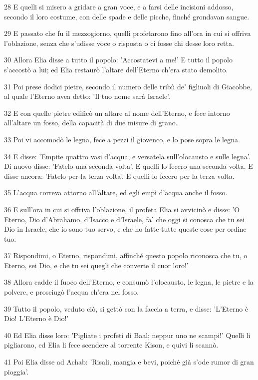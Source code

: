 \par 28 E quelli si misero a gridare a gran voce, e a farsi delle incisioni addosso, secondo il loro costume, con delle spade e delle picche, finché grondavan sangue.
\par 29 E passato che fu il mezzogiorno, quelli profetarono fino all'ora in cui si offriva l'oblazione, senza che s'udisse voce o risposta o ci fosse chi desse loro retta.
\par 30 Allora Elia disse a tutto il popolo: 'Accostatevi a me!' E tutto il popolo s'accostò a lui; ed Elia restaurò l'altare dell'Eterno ch'era stato demolito.
\par 31 Poi prese dodici pietre, secondo il numero delle tribù de' figliuoli di Giacobbe, al quale l'Eterno avea detto: 'Il tuo nome sarà Israele'.
\par 32 E con quelle pietre edificò un altare al nome dell'Eterno, e fece intorno all'altare un fosso, della capacità di due misure di grano.
\par 33 Poi vi accomodò le legna, fece a pezzi il giovenco, e lo pose sopra le legna.
\par 34 E disse: 'Empite quattro vasi d'acqua, e versatela sull'olocausto e sulle legna'. Di nuovo disse: 'Fatelo una seconda volta'. E quelli lo fecero una seconda volta. E disse ancora: 'Fatelo per la terza volta'. E quelli lo fecero per la terza volta.
\par 35 L'acqua correva attorno all'altare, ed egli empì d'acqua anche il fosso.
\par 36 E sull'ora in cui si offriva l'oblazione, il profeta Elia si avvicinò e disse: 'O Eterno, Dio d'Abrahamo, d'Isacco e d'Israele, fa' che oggi si conosca che tu sei Dio in Israele, che io sono tuo servo, e che ho fatte tutte queste cose per ordine tuo.
\par 37 Rispondimi, o Eterno, rispondimi, affinché questo popolo riconosca che tu, o Eterno, sei Dio, e che tu sei quegli che converte il cuor loro!'
\par 38 Allora cadde il fuoco dell'Eterno, e consumò l'olocausto, le legna, le pietre e la polvere, e prosciugò l'acqua ch'era nel fosso.
\par 39 Tutto il popolo, veduto ciò, si gettò con la faccia a terra, e disse: 'L'Eterno è Dio! L'Eterno è Dio!'
\par 40 Ed Elia disse loro: 'Pigliate i profeti di Baal; neppur uno ne scampi!' Quelli li pigliarono, ed Elia li fece scendere al torrente Kison, e quivi li scannò.
\par 41 Poi Elia disse ad Achab: 'Risali, mangia e bevi, poiché già s'ode rumor di gran pioggia'.

